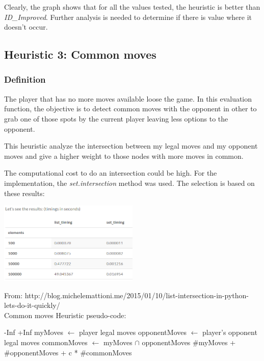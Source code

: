 \documentclass[10pt, a4paper,english]{article}
\begin{document}
Clearly, the graph shows that for all the values tested, the heuristic is better than \textit{ID\_Improved}. Further analysis is needed to determine if there is value where it doesn't occur.

\subsection{Heuristic 3: Common moves}

\subsubsection{Definition}

The player that has no more moves available loose the game. In this evaluation function, the objective is to detect common moves with the opponent in other to grab one of those spots by the current player leaving less options to the opponent.

This heuristic analyze the intersection between my legal moves and my opponent moves and give a higher weight to those nodes with more moves in common.

The computational cost to do an intersection could be high. For the implementation, the \textit{set.intersection} method was used. The selection is based on these results:

\begin{center}
\includegraphics[width=0.5\textwidth]{time_intersec.PNG}\\
\end{center}

{\footnotesize From: http://blog.michelemattioni.me/2015/01/10/list-intersection-in-python-lets-do-it-quickly}/\\

Common moves Heuristic pseudo-code: \\

\begin{algorithmic}
    \State\Return -Inf
\EndIf    
{}
   \State \Return +Inf
\Else
		\State myMoves $\leftarrow$ player legal moves
    	\State opponentMoves $\leftarrow$ player's opponent legal moves
        \State commonMoves $\leftarrow$ myMoves $\cap$ opponentMoves
    	\State\Return \#myMoves + \#opponentMoves + c * \#commonMoves
	
\EndIf
\EndFunction
\end{algorithmic}
\end{document}
